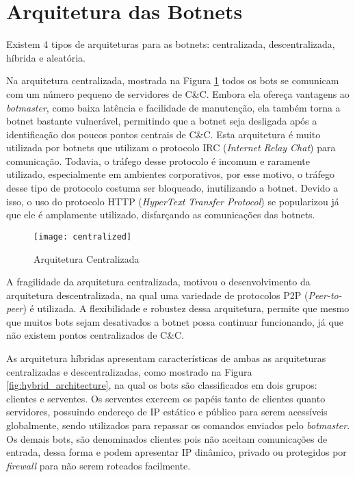 \section{Arquitetura das Botnets}
Existem 4 tipos de arquiteturas para as botnets: centralizada, descentralizada, híbrida e aleatória. 

Na arquitetura centralizada, mostrada na Figura \ref{fig:centralized_architecture} todos os bots se comunicam com um número pequeno de servidores de C\&C. Embora ela ofereça vantagens ao \textit{botmaster}, como baixa latência e facilidade de manutenção, ela também torna a botnet bastante vulnerável, permitindo que a botnet seja desligada após a identificação dos poucos pontos centrais de C\&C. Esta arquitetura é muito utilizada por botnets que utilizam o protocolo IRC (\textit{Internet Relay Chat}) para comunicação. Todavia, o tráfego desse protocolo é incomum e raramente utilizado, especialmente em ambientes corporativos, por esse motivo, o tráfego desse tipo de protocolo costuma ser bloqueado, inutilizando a botnet. Devido a isso, o uso do protocolo HTTP (\textit{HyperText Transfer Protocol}) se popularizou já que ele é amplamente utilizado, disfarçando as comunicações das botnets.

\begin{figure}
\texttt{[image: centralized]}
\caption[Arquitetura Centralizada]{Arquitetura Centralizada\citep{wang2010advanced}} \label{fig:centralized_architecture}
\end{figure}

A fragilidade da arquitetura centralizada, motivou o desenvolvimento da arquitetura descentralizada, na qual uma variedade de protocolos P2P (\textit{Peer-to-peer}) é utilizada. A flexibilidade e robustez dessa arquitetura, permite que mesmo que muitos bots sejam desativados a botnet possa continuar funcionando, já que não existem pontos centralizados de C\&C. 

As arquitetura híbridas apresentam características de ambas as arquiteturas centralizadas e descentralizadas, como mostrado na Figura \ref{fig:hybrid_architecture}, na qual os bots são classificados em dois grupos: clientes e serventes. Os serventes exercem os papéis tanto de clientes quanto servidores, possuindo endereço de IP estático e público para serem acessíveis globalmente, sendo utilizados para repassar os comandos enviados pelo \textit{botmaster}. Os demais bots, são denominados clientes pois não aceitam comunicações de entrada, dessa forma e podem apresentar IP dinâmico, privado ou protegidos por \textit{firewall} para não serem roteados facilmente. 

